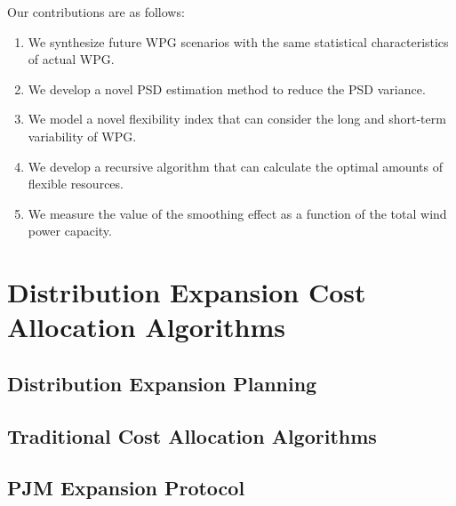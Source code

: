 \documentclass[journal]{IEEEtran} %
\begin{document}
Our contributions are as follows:
\begin{enumerate}	
	\item We synthesize future WPG scenarios with the same statistical characteristics of actual WPG.
	\item We develop a novel PSD estimation method to reduce the PSD variance.	
	\item We model a novel flexibility index that can consider the long and short-term variability of WPG.	
	\item We develop a recursive algorithm that can calculate the optimal amounts of flexible resources.
	\item We measure the value of the smoothing effect as a function of the total wind power capacity.
\end{enumerate}

























\newpage
\section{Distribution Expansion Cost Allocation Algorithms}




\subsection{Distribution Expansion Planning}






\subsection{Traditional Cost Allocation Algorithms}






\newpage
\subsection{PJM Expansion Protocol}
\end{document}
